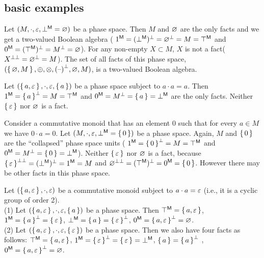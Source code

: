 \subsection{basic examples}
\begin{example}  
%
Let $(M, \cdot, \varepsilon, {\bot}^{\sf M} = \varnothing)$
be a phase space.  
Then $M$ and $\varnothing$ are the only facts and we get a two-valued Boolean algebra
( ${\mbox{\boldmath{1}}}^{\sf M} = {({\bot}^{\sf M})^{\bot}} = {{\varnothing}^{\bot}} = M = {\top}^{\sf M}$ and
${\mbox{\boldmath{0}}}^{\sf M} = {({\top}^{\sf M})^{\bot}} = {{M}^{\bot}} = \varnothing$). 
For any non-empty $X \subset M$, $X$ is not a fact(${{X}^{\bot\bot}} = {{\varnothing}^{\bot}} = M$).
The set of all facts of this phase space, 
$(\set{\varnothing,M},\oplus,\otimes,{{{(\mbox{\textendash})}}^{\bot}},\varnothing,M)$,  is a two-valued Boolean algebra. 
\end{example}
\begin{example}
Let $(\set{a,\varepsilon}, \cdot, \varepsilon,\set{a})$ be a phase space subject to $a \cdot a = a$. 
Then
${\mbox{\boldmath{1}}}^{\sf M} = {{\set{a}}^{\bot}} = M = {\top}^{\sf M}$ and ${\mbox{\boldmath{0}}}^{\sf M} = {{M}^{\bot}} = \set{a} = {\bot}^{\sf M}$ are the only facts. 
Neither $\set{\varepsilon}$ nor $\varnothing$ is a fact. 
\end{example}
\begin{example} \label{example:collapsedUnits}
Consider a commutative monoid that has an element $0$ 
such that for every  $a \in M$  we have $0 \cdot a = 0$.
%
Let $(M, \cdot, \varepsilon, {\bot}^{\sf M} = \set{0})$
be a phase space. Again, $M$ and $\set{0}$ are the ``collapsed'' phase space units (
${\mbox{\boldmath{1}}}^{\sf M} =  {{\set{0}}^{\bot}} = M = {\top}^{\sf M}$
and 
${\mbox{\boldmath{0}}}^{\sf M} = {{M}^{\bot}} = \set{0} = {\bot}^{\sf M}$). 
Neither $\set{\varepsilon}$ nor $\varnothing$ is a fact, 
because ${{\set{\varepsilon}}^{\bot\bot}} = {({\bot}^{\sf M})^{\bot}} = {\mbox{\boldmath{1}}}^{\sf M} = M$ and 
${{\varnothing}^{\bot\bot}} = {({\top}^{\sf M})^{\bot}} = {\mbox{\boldmath{0}}}^{\sf M} = \set{0}$. However there may be other facts in this phase space. 
\end{example}
\begin{example}
Let $(\set{a,\varepsilon}, \cdot, \varepsilon)$ be a commutative monoid subject to $a \cdot a = \varepsilon$ (i.e., it is a cyclic group of order 2). 
\\
(1)  Let $(\set{a,\varepsilon}, \cdot, \varepsilon, \set{a} )$
 be a phase space.  Then 
${\top}^{\sf M} = \set{a,\varepsilon}$,
${\mbox{\boldmath{1}}}^{\sf M} = {{\set{a}}^{\bot}} = \set{\varepsilon}$,
${\bot}^{\sf M} = \set{a} = {{\set{\varepsilon}}^{\bot}}$,
${\mbox{\boldmath{0}}}^{\sf M} = {{\set{a,\varepsilon}}^{\bot}} = \varnothing$.
\\
(2)  Let $(\set{a,\varepsilon}, \cdot, \varepsilon, \set{\varepsilon} )$
 be a phase space. Then we also have four facts as follows: 
${\top}^{\sf M} = \set{a,\varepsilon}$, 
${\mbox{\boldmath{1}}}^{\sf M} = {{\set{\varepsilon}}^{\bot}} = \set{\varepsilon} = {\bot}^{\sf M}$,
$\set{a} = {{\set{a}}^{\bot}}$ ,
${\mbox{\boldmath{0}}}^{\sf M} = {{\set{a,\varepsilon}}^{\bot}} = \varnothing$.
%
\end{example}


